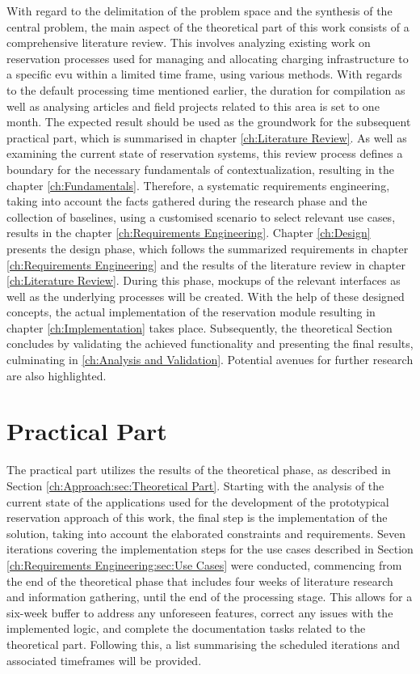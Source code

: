 With regard to the delimitation of the problem space and the synthesis of the central problem, the main aspect of the theoretical part of this work consists of a comprehensive literature review.
This involves analyzing existing work on reservation processes used for managing  and allocating charging infrastructure to a specific \acrshort{evu} within a limited time frame, using various methods.
With regards to the default processing time mentioned earlier, the duration for compilation as well as analysing articles and field projects related to this area is set to one month. 
The expected result should be used as the groundwork for the subsequent practical part, which is summarised in chapter \ref{ch:Literature Review}.
As well as examining the current state of reservation systems, this review process defines a boundary for the necessary fundamentals of contextualization, resulting in the chapter \ref{ch:Fundamentals}.
Therefore, a systematic requirements engineering, taking into account the facts gathered during the research phase and the collection of baselines, using a customised scenario to select relevant use cases, results in the chapter \ref{ch:Requirements Engineering}.
Chapter \ref{ch:Design} presents the design phase, which follows the summarized requirements in chapter \ref{ch:Requirements Engineering} and the results of the literature review in chapter \ref{ch:Literature Review}. During this phase, mockups of the relevant interfaces as well as the underlying processes will be created.
With the help of these designed concepts, the actual implementation of the reservation module resulting in chapter \ref{ch:Implementation} takes place.
Subsequently, the theoretical Section concludes by validating the achieved functionality and presenting the final results, culminating in \ref{ch:Analysis and Validation}. Potential avenues for further research are also highlighted.

\section{Practical Part}
\label{ch:Approach:sec:Practical Part}

The practical part utilizes the results of the theoretical phase, as described in Section \ref{ch:Approach:sec:Theoretical Part}. Starting with the analysis of the current state of the applications used for the development of the prototypical reservation approach of this work, the final step is the implementation of the solution, taking into account the elaborated constraints and requirements.
Seven iterations covering the implementation steps for the use cases described in Section \ref{ch:Requirements Engineering:sec:Use Cases} were conducted, commencing from the end of the theoretical phase that includes four weeks of literature research and information gathering, until the end of the processing stage.
This allows for a six-week buffer to address any unforeseen features, correct any issues with the implemented logic, and complete the documentation tasks related to the theoretical part.
Following this, a list summarising the scheduled iterations and associated timeframes will be provided.

